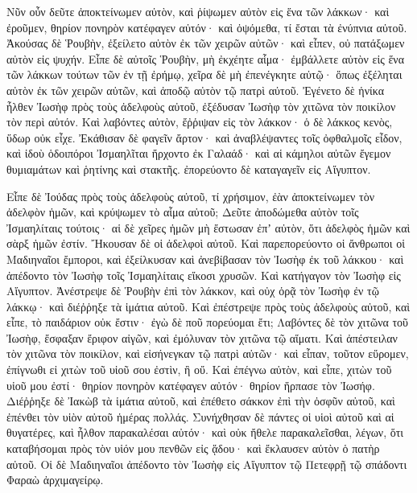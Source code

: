 {Νῦν οὖν δεῦτε ἀποκτείνωμεν αὐτὸν, καὶ ῥίψωμεν αὐτὸν εἰς ἕνα τῶν λάκκων· καὶ ἐροῦμεν, θηρίον πονηρὸν κατέφαγεν αὐτόν· καὶ ὀψόμεθα, τί ἔσται τὰ ἐνύπνια αὐτοῦ.
Ἀκούσας δὲ Ῥουβὴν, ἐξείλετο αὐτὸν ἐκ τῶν χειρῶν αὐτῶν· καὶ εἶπεν, οὐ πατάξωμεν αὐτὸν εἰς ψυχήν.
Εἶπε δὲ αὐτοῖς Ῥουβὴν, μὴ ἐκχέητε αἷμα· ἐμβάλλετε αὐτὸν εἰς ἕνα τῶν λάκκων τούτων τῶν ἐν τῇ ἐρήμῳ, χεῖρα δὲ μὴ ἐπενέγκητε αὐτῷ· ὅπως ἐξέληται αὐτὸν ἐκ τῶν χειρῶν αὐτῶν, καὶ ἀποδῷ αὐτὸν τῷ πατρὶ αὐτοῦ.
Ἐγένετο δὲ ἡνίκα ἦλθεν Ἰωσὴφ πρὸς τοὺς ἀδελφοὺς αὐτοῦ, ἐξέδυσαν Ἰωσὴφ τὸν χιτῶνα τὸν ποικίλον τὸν περὶ αὐτόν.
Καὶ λαβόντες αὐτὸν, ἔῤῥιψαν εἰς τὸν λάκκον· ὁ δὲ λάκκος κενὸς, ὕδωρ οὐκ εἶχε.
Ἐκάθισαν δὲ φαγεῖν ἄρτον· καὶ ἀναβλέψαντες τοῖς ὀφθαλμοῖς εἶδον, καὶ ἰδοὺ ὁδοιπόροι Ἰσμαηλῖται ἤρχοντο ἐκ Γαλαάδ· καὶ αἱ κάμηλοι αὐτῶν ἔγεμον θυμιαμάτων καὶ ῥητίνης καὶ στακτῆς. ἐπορεύοντο δὲ καταγαγεῖν εἰς Αἴγυπτον.
\par }{\PP {}Εἶπε δὲ Ἰούδας πρὸς τοὺς ἀδελφοὺς αὐτοῦ, τί χρήσιμον, ἐὰν ἀποκτείνωμεν τὸν ἀδελφὸν ἡμῶν, καὶ κρύψωμεν τὸ αἷμα αὐτοῦ;
Δεῦτε ἀποδώμεθα αὐτὸν τοῖς Ἰσμαηλίταις τούτοις· αἱ δὲ χεῖρες ἡμῶν μὴ ἔστωσαν ἐπʼ αὐτὸν, ὅτι ἀδελφὸς ἡμῶν καὶ σὰρξ ἡμῶν ἐστίν. Ἤκουσαν δὲ οἱ ἀδελφοὶ αὐτοῦ.
Καὶ παρεπορεύοντο οἱ ἄνθρωποι οἱ Μαδιηναῖοι ἔμποροι, καὶ ἐξείλκυσαν καὶ ἀνεβίβασαν τὸν Ἰωσὴφ ἐκ τοῦ λάκκου· καὶ ἀπέδοντο τὸν Ἰωσὴφ τοῖς Ἰσμαηλίταις εἴκοσι χρυσῶν. Καὶ κατήγαγον τὸν Ἰωσὴφ εἰς Αἴγυπτον.
Ἀνέστρεψε δὲ Ῥουβὴν ἐπὶ τὸν λάκκον, καὶ οὐχ ὁρᾷ τὸν Ἰωσὴφ ἐν τῷ λάκκῳ· καὶ διέῤῥηξε τὰ ἱμάτια αὐτοῦ.
Καὶ ἐπέστρεψε πρὸς τοὺς ἀδελφοὺς αὐτοῦ, καὶ εἶπε, τὸ παιδάριον οὐκ ἔστιν· ἐγὼ δὲ ποῦ πορεύομαι ἔτι;
Λαβόντες δὲ τὸν χιτῶνα τοῦ Ἰωσὴφ, ἔσφαξαν ἔριφον αἰγῶν, καὶ ἐμόλυναν τὸν χιτῶνα τῷ αἵματι.
Καὶ ἀπέστειλαν τὸν χιτῶνα τὸν ποικίλον, καὶ εἰσήνεγκαν τῷ πατρὶ αὐτῶν· καὶ εἶπαν, τοῦτον εὕρομεν, ἐπίγνωθι εἰ χιτὼν τοῦ υἱοῦ σου ἐστὶν, ἢ οὔ.
Καὶ ἐπέγνω αὐτὸν, καὶ εἶπε, χιτὼν τοῦ υἱοῦ μου ἐστί· θηρίον πονηρὸν κατέφαγεν αὐτόν· θηρίον ἥρπασε τὸν Ἰωσήφ.
Διέῤῥηξε δὲ Ἰακὼβ τὰ ἱμάτια αὐτοῦ, καὶ ἐπέθετο σάκκον ἐπὶ τὴν ὀσφῦν αὐτοῦ, καὶ ἐπένθει τὸν υἱὸν αὐτοῦ ἡμέρας πολλάς.
Συνήχθησαν δὲ πάντες οἱ υἱοὶ αὐτοῦ καὶ αἱ θυγατέρες, καὶ ἦλθον παρακαλέσαι αὐτόν· καὶ οὐκ ἤθελε παρακαλεῖσθαι, λέγων, ὅτι καταβήσομαι πρὸς τὸν υἱόν μου πενθῶν εἰς ᾅδου· καὶ ἔκλαυσεν αὐτὸν ὁ πατὴρ αὐτοῦ.
Οἱ δὲ Μαδιηναῖοι ἀπέδοντο τὸν Ἰωσὴφ εἰς Αἴγυπτον τῷ Πετεφρῇ τῷ σπάδοντι Φαραὼ ἀρχιμαγείρῳ.

}
